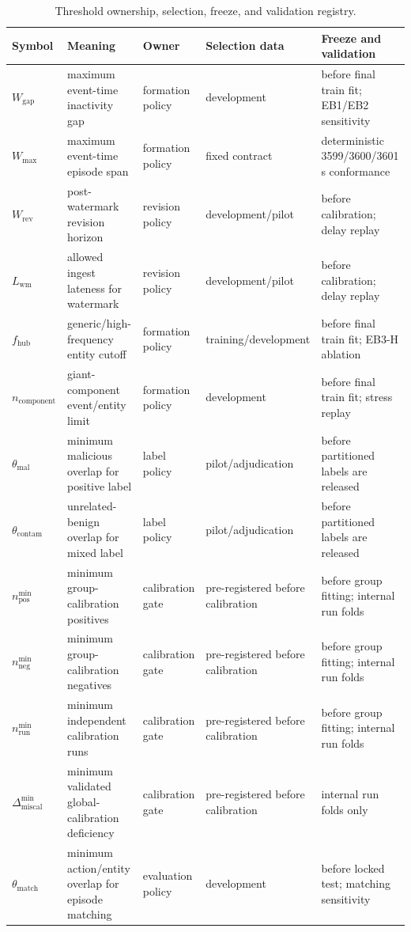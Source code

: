\begin{table}[t]
\caption{Threshold ownership, selection, freeze, and validation registry.}
\label{tab:threshold-registry}
\centering
\scriptsize
\begin{tabular}{p{}p{}p{}p{}p{}}
\toprule
\textbf{Symbol} & \textbf{Meaning} & \textbf{Owner} & \textbf{Selection data} & \textbf{Freeze and validation} \\
\midrule
$W_{\mathrm{gap}}$ & maximum event-time inactivity gap & formation policy & development & before final train fit; EB1/EB2 sensitivity \\
$W_{\max}$ & maximum event-time episode span & formation policy & fixed contract & deterministic 3599/3600/3601 s conformance \\
$W_{\mathrm{rev}}$ & post-watermark revision horizon & revision policy & development/pilot & before calibration; delay replay \\
$L_{\mathrm{wm}}$ & allowed ingest lateness for watermark & revision policy & development/pilot & before calibration; delay replay \\
$f_{\mathrm{hub}}$ & generic/high-frequency entity cutoff & formation policy & training/development & before final train fit; EB3-H ablation \\
$n_{\mathrm{component}}$ & giant-component event/entity limit & formation policy & development & before final train fit; stress replay \\
$\theta_{\mathrm{mal}}$ & minimum malicious overlap for positive label & label policy & pilot/adjudication & before partitioned labels are released \\
$\theta_{\mathrm{contam}}$ & unrelated-benign overlap for mixed label & label policy & pilot/adjudication & before partitioned labels are released \\
$n_{\mathrm{pos}}^{\min}$ & minimum group-calibration positives & calibration gate & pre-registered before calibration & before group fitting; internal run folds \\
$n_{\mathrm{neg}}^{\min}$ & minimum group-calibration negatives & calibration gate & pre-registered before calibration & before group fitting; internal run folds \\
$n_{\mathrm{run}}^{\min}$ & minimum independent calibration runs & calibration gate & pre-registered before calibration & before group fitting; internal run folds \\
$\Delta_{\mathrm{miscal}}^{\min}$ & minimum validated global-calibration deficiency & calibration gate & pre-registered before calibration & internal run folds only \\
$\theta_{\mathrm{match}}$ & minimum action/entity overlap for episode matching & evaluation policy & development & before locked test; matching sensitivity \\
\bottomrule
\end{tabular}
\end{table}

